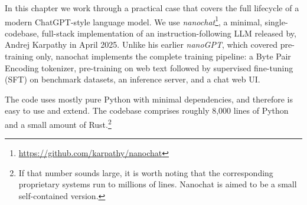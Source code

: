 In this chapter we work through a practical case that covers the full lifecycle of a modern ChatGPT-style language model.  We use \textit{nanochat}\footnote{\url{https://github.com/karpathy/nanochat}}, a minimal, single-codebase, full-stack implementation of an instruction-following LLM released by, Andrej Karpathy in April 2025. Unlike his earlier \textit{nanoGPT}, which covered pre-training only, nanochat implements the complete training pipeline: a Byte Pair Encoding tokenizer, pre-training on web text followed by supervised fine-tuning (SFT) on benchmark datasets, an inference server, and a chat web UI.

The code uses mostly pure Python with minimal dependencies, and therefore is easy to use and extend. The codebase comprises roughly 8{,}000 lines of Python and a small amount of Rust.\footnote{If that number sounds large, it is worth noting that the corresponding proprietary systems run to millions of lines. Nanochat is aimed to be a small self-contained version.}

